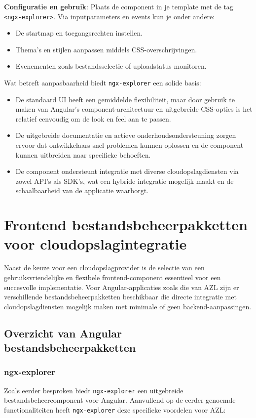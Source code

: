 \textbf{Configuratie en gebruik}: Plaats de component in je template met de tag \texttt{<ngx-explorer>}. Via inputparameters en events kun je onder andere:
  \begin{itemize}
    \item De startmap en toegangsrechten instellen.
    \item Thema's en stijlen aanpassen middels CSS-overschrijvingen.
    \item Evenementen zoals bestandsselectie of uploadstatus monitoren.
  \end{itemize}

Wat betreft aanpasbaarheid biedt \texttt{ngx-explorer} een solide basis:
\begin{itemize}
  \item De standaard UI heeft een gemiddelde flexibiliteit, maar door gebruik te maken van Angular's component-architectuur en uitgebreide CSS-opties is het relatief eenvoudig om de look en feel aan te passen.
  \item De uitgebreide documentatie en actieve onderhoudsondersteuning zorgen ervoor dat ontwikkelaars snel problemen kunnen oplossen en de component kunnen uitbreiden naar specifieke behoeften.
  \item De component ondersteunt integratie met diverse cloudopslagdiensten via zowel API's als SDK's, wat een hybride integratie mogelijk maakt en de schaalbaarheid van de applicatie waarborgt.
\end{itemize}

\section{Frontend bestandsbeheerpakketten voor cloudopslagintegratie}
Naast de keuze voor een cloudopslagprovider is de selectie van een gebruiksvriendelijke en flexibele frontend-component essentieel voor een succesvolle implementatie. Voor Angular-applicaties zoals die van AZL zijn er verschillende bestandsbeheerpakketten beschikbaar die directe integratie met cloudopslagdiensten mogelijk maken met minimale of geen backend-aanpassingen.

\subsection{Overzicht van Angular bestandsbeheerpakketten}
\subsubsection{ngx-explorer}
Zoals eerder besproken biedt \texttt{ngx-explorer} een uitgebreide bestandsbeheercomponent voor Angular. Aanvullend op de eerder genoemde functionaliteiten heeft \texttt{ngx-explorer} deze specifieke voordelen voor AZL:

